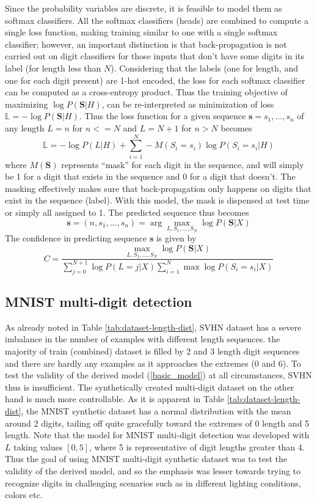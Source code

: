 \documentclass{article}
\begin{document}
	Since the probability variables are discrete, it is feasible to model them as softmax classifiers. All the softmax classifiers (heads) are combined to compute a single loss function, making training similar to one with a single softmax classifier; however, an important distinction is that back-propagation is not carried out on digit classifiers for those inputs that don't have some digits in its label (for length less than $N$). Considering that the labels (one for length, and one for each digit present) are 1-hot encoded, the loss for each softmax classifier can be computed as a cross-entropy product. Thus the training objective of maximizing $\log P(\mathbf{S}|H)$, can be re-interpreted as minimization of loss $ \mathbb{L} = -\log P(\mathbf{S}|H)$. Thus the loss function for a given sequence $\mathbf{s} = s_1, ..., s_n$ of any length $L = n$ for $n <= N$ and $L = N+1$ for $n > N$ becomes
	\[\mathbb{L} = -\log P(L|H) + \sum_{i=1}^{N} -M(S_i = s_i)\log P(S_i = s_i|H) \]
	where $M(\mathbf{S})$ represents ``mask'' for each digit in the sequence, and will simply be 1 for a digit that exists in the sequence and 0 for a digit that doesn't. The masking effectively makes sure that back-propagation only happens on digits that exist in the sequence (label). With this model, the mask is dispensed at test time or simply all assigned to 1. The predicted sequence thus becomes
	\[\mathbf{s} = (n, s_1, ..., s_n) = \arg \max_{L, S_1, ..., S_N} \log P(\mathbf{S}|X) \]
	The confidence in predicting sequence $\mathbf{s}$ is given by
	\[C =  \frac{\max_{L, S_1, ..., S_N} \log P(\mathbf{S}|X)}{\sum_{j=0}^{N+1}\log P(L=j|X) \sum_{i=1}^{N} \max \log P(S_i = s_i | X)}\]
	
	\subsection{MNIST multi-digit detection}
	As already noted in Table \ref{tab:dataset-length-dist}, SVHN dataset has a severe imbalance in the number of examples with different length sequences. the majority of train (combined) dataset is filled by 2 and 3 length digit sequences and there are hardly any examples as it approaches the extremes (0 and 6). To test the validity of the derived model (\ref{basic_model}) at all circumstances, SVHN thus is insufficient. The synthetically created multi-digit dataset on the other hand is much more controllable. As it is apparent in Table \ref{tab:dataset-length-dist}, the MNIST synthetic dataset has a normal distribution with the mean around 2 digits, tailing off quite gracefully toward the extremes of 0 length and 5 length. Note that the model for MNIST multi-digit detection was developed with $L$ taking values $[0,5]$, where 5 is representative of digit lengths greater than 4. Thus the goal of using MNIST multi-digit synthetic dataset was to test the validity of the derived model, and so the emphasis was lesser towards trying to recognize digits in challenging scenarios such as in different lighting conditions, colors etc.
	
\end{document}
